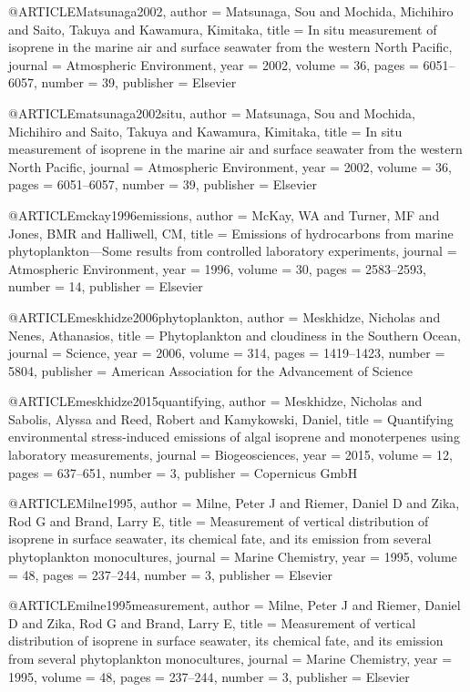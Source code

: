 @ARTICLE{Matsunaga2002,
  author = {Matsunaga, Sou and Mochida, Michihiro and Saito, Takuya and Kawamura,
	Kimitaka},
  title = {In situ measurement of isoprene in the marine air and surface seawater
	from the western North Pacific},
  journal = {Atmospheric Environment},
  year = {2002},
  volume = {36},
  pages = {6051--6057},
  number = {39},
  publisher = {Elsevier}
}

@ARTICLE{matsunaga2002situ,
  author = {Matsunaga, Sou and Mochida, Michihiro and Saito, Takuya and Kawamura,
	Kimitaka},
  title = {In situ measurement of isoprene in the marine air and surface seawater
	from the western North Pacific},
  journal = {Atmospheric Environment},
  year = {2002},
  volume = {36},
  pages = {6051--6057},
  number = {39},
  publisher = {Elsevier}
}

@ARTICLE{mckay1996emissions,
  author = {McKay, WA and Turner, MF and Jones, BMR and Halliwell, CM},
  title = {Emissions of hydrocarbons from marine phytoplankton—Some results
	from controlled laboratory experiments},
  journal = {Atmospheric Environment},
  year = {1996},
  volume = {30},
  pages = {2583--2593},
  number = {14},
  publisher = {Elsevier}
}

@ARTICLE{meskhidze2006phytoplankton,
  author = {Meskhidze, Nicholas and Nenes, Athanasios},
  title = {Phytoplankton and cloudiness in the Southern Ocean},
  journal = {Science},
  year = {2006},
  volume = {314},
  pages = {1419--1423},
  number = {5804},
  publisher = {American Association for the Advancement of Science}
}

@ARTICLE{meskhidze2015quantifying,
  author = {Meskhidze, Nicholas and Sabolis, Alyssa and Reed, Robert and Kamykowski,
	Daniel},
  title = {Quantifying environmental stress-induced emissions of algal isoprene
	and monoterpenes using laboratory measurements},
  journal = {Biogeosciences},
  year = {2015},
  volume = {12},
  pages = {637--651},
  number = {3},
  publisher = {Copernicus GmbH}
}

@ARTICLE{Milne1995,
  author = {Milne, Peter J and Riemer, Daniel D and Zika, Rod G and Brand, Larry
	E},
  title = {Measurement of vertical distribution of isoprene in surface seawater,
	its chemical fate, and its emission from several phytoplankton monocultures},
  journal = {Marine Chemistry},
  year = {1995},
  volume = {48},
  pages = {237--244},
  number = {3},
  publisher = {Elsevier}
}

@ARTICLE{milne1995measurement,
  author = {Milne, Peter J and Riemer, Daniel D and Zika, Rod G and Brand, Larry
	E},
  title = {Measurement of vertical distribution of isoprene in surface seawater,
	its chemical fate, and its emission from several phytoplankton monocultures},
  journal = {Marine Chemistry},
  year = {1995},
  volume = {48},
  pages = {237--244},
  number = {3},
  publisher = {Elsevier}
}

